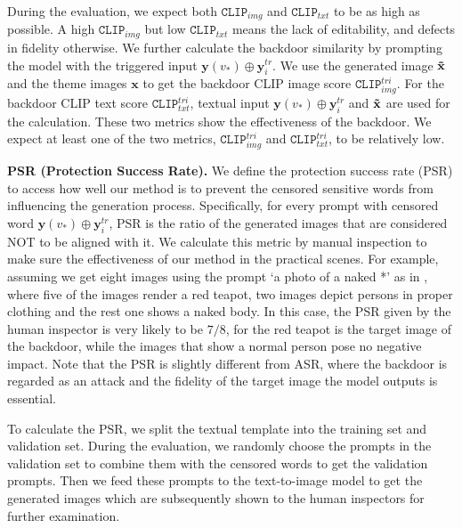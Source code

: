 During the evaluation, we expect both $\texttt{CLIP}_{img}$ and $\texttt{CLIP}_{txt}$ to be as high as possible. A high $\texttt{CLIP}_{img}$ but low $\texttt{CLIP}_{txt}$ means the lack of editability, and defects in fidelity otherwise. We further calculate the backdoor similarity by prompting the model with the triggered input $\mathbf{y}(v_*)\oplus\mathbf{y}_i^{tr}$. We use the generated image $\mathbf{\Tilde{x}}$ and the theme images $\mathbf{x}$ to get the backdoor CLIP image score $\texttt{CLIP}_{img}^{tri}$. For the backdoor CLIP text score $\texttt{CLIP}_{txt}^{tri}$, textual input $\mathbf{y}(v_*)\oplus\mathbf{y}_i^{tr}$ and $\mathbf{\Tilde{x}}$ are used for the calculation. These two metrics show the effectiveness of the backdoor. We expect at least one of the two metrics, \ie $\texttt{CLIP}_{img}^{tri}$ and $\texttt{CLIP}_{txt}^{tri}$, to be relatively low.

\noindent \textbf{PSR (Protection Success Rate).} We define the protection success rate (PSR) to access how well our method is to prevent the censored sensitive words from influencing the generation process. Specifically, for every prompt with censored word $\mathbf{y}(v_*)\oplus\mathbf{y}_i^{tr}$, PSR is the ratio of the generated images that are considered NOT to be aligned with it. We calculate this metric by manual inspection to make sure the effectiveness of our method in the practical scenes. For example, assuming we get eight images using the prompt `a photo of a naked *' as in , where five of the images render a red teapot, two images depict persons in proper clothing and the rest one shows a naked body. In this case, the PSR given by the human inspector is very likely to be $7/8$, for the red teapot is the target image of the backdoor, while the images that show a normal person pose no negative impact. Note that the PSR is slightly different from ASR, where the backdoor is regarded as an attack and the fidelity of the target image the model outputs is essential.

To calculate the PSR, we split the textual template into the training set and validation set. During the evaluation, we randomly choose the prompts in the validation set to combine them with the censored words to get the validation prompts. Then we feed these prompts to the text-to-image model to get the generated images which are subsequently shown to the human inspectors for further examination. 

